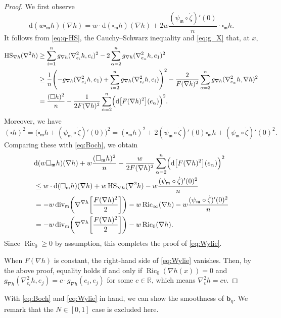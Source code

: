 \documentclass[a4paper,11pt]{article}
\numberwithin{equation}{section}
\theoremstyle{definition}
\theoremstyle{plain}
\newcommand{\dd}{\mathrm{d}}
\newcommand{\R}{\ensuremath{\mathbb{R}}}
\newcommand{\fm}{\ensuremath{\mathfrak{m}}}
\newcommand{\bb}{\ensuremath{\mathbf{b}}}
\def\div{\mathop{\mathrm{div}}\nolimits}
\def\Ric{\mathop{\mathrm{Ric}}\nolimits}
\def\HS{\mathop{\mathrm{HS}}\nolimits}
\begin{document}
\begin{proof}
We first observe
\[ \dd(w\square_\fm h)(\nabla h)
=w \cdot \dd(\square_\fm h)(\nabla h) +2w\frac{(\psi_\fm \circ \dot{\zeta})'(0)}{n} \cdot \square_\fm h.\]
It follows from \eqref{eq:q-HS}, the Cauchy--Schwarz inequality and \eqref{eq:g_X} that, at $x$,
\begin{align*}
\HS_{\nabla h}(\nabla^2 h)
&\ge \sum_{i=1}^n g_{\nabla h}(\nabla^2_{e_i} h,e_i)^2
-2\sum_{\alpha=2}^n g_{\nabla h}(\nabla^2_{e_\alpha} h,e_1)^2 \\
&\ge \frac{1}{n} \Biggl( -g_{\nabla h}(\nabla^2_{e_1} h,e_1) +\sum_{i=2}^n g_{\nabla h}(\nabla^2_{e_i} h,e_i) \Biggr)^2
-\frac{2}{F(\nabla h)^2} \sum_{\alpha=2}^n g_{\nabla h}(\nabla^2_{e_\alpha} h,\nabla h)^2 \\
&=\frac{(\square h)^2}{n} -\frac{1}{2F(\nabla h)^2} \sum_{\alpha=2}^n \Bigl( \dd\bigl[ F(\nabla h)^2 \bigr](e_\alpha) \Bigr)^2.
\end{align*}
Moreover, we have
\[ (\square h)^2 =\bigl( \square_\fm h +(\psi_\fm \circ \dot{\zeta})'(0) \bigr)^2
= (\square_\fm h)^2 +2(\psi_\fm \circ \dot{\zeta})'(0) \square_\fm h +(\psi_\fm \circ \dot{\zeta})'(0)^2. \]
Comparing these with \eqref{eq:Boch}, we obtain
\begin{align*}
&\dd(w\square_\fm h)(\nabla h) +w \frac{(\square_\fm h)^2}{n} -\frac{w}{2F(\nabla h)^2} \sum_{\alpha=2}^n \Bigl( \dd\bigl[ F(\nabla h)^2 \bigr](e_\alpha) \Bigr)^2 \\
&\le w \cdot \dd(\square_\fm h)(\nabla h) +w\HS_{\nabla h}(\nabla^2 h) -w\frac{(\psi_\fm \circ \dot{\zeta})'(0)^2}{n} \\
&= -w\div_\fm \biggl( \nabla^{\nabla h} \biggl[ \frac{F(\nabla h)^2}{2} \biggr] \biggr) -w\Ric_\infty(\nabla h) -w\frac{(\psi_\fm \circ \dot{\zeta})'(0)^2}{n} \\
&= -w\div_\fm \biggl( \nabla^{\nabla h} \biggl[ \frac{F(\nabla h)^2}{2} \biggr] \biggr) -w\Ric_0(\nabla h).
\end{align*}
Since $\Ric_0 \ge 0$ by assumption, this completes the proof of \eqref{eq:Wylie}.

When $F(\nabla h)$ is constant, the right-hand side of \eqref{eq:Wylie} vanishes.
Then, by the above proof, equality holds if and only if $\Ric_0(\nabla h(x))=0$ and $g_{\nabla h}(\nabla^2_{e_i} h,e_j)=c \cdot g_{\nabla h}(e_i,e_j)$ for some $c \in \R$, which means $\nabla^2_v h=cv$.
\end{proof}

With \eqref{eq:Boch} and \eqref{eq:Wylie} in hand, we can show the smoothness of $\bb_\eta$.
We remark that the $N \in [0,1]$ case is excluded here.
\end{document}

